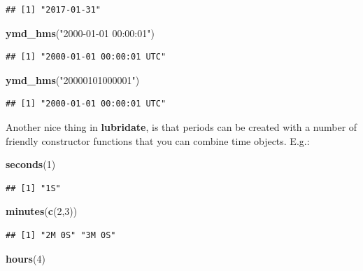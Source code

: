 \documentclass[]{book}
\newenvironment{Shaded}{\begin{snugshade}}{\end{snugshade}}
\newcommand{\DecValTok}[1]{\textcolor[rgb]{0.00,0.00,0.81}{#1}}
\newcommand{\KeywordTok}[1]{\textcolor[rgb]{0.13,0.29,0.53}{\textbf{#1}}}
\newcommand{\NormalTok}[1]{#1}
\newcommand{\StringTok}[1]{\textcolor[rgb]{0.31,0.60,0.02}{#1}}
\theoremstyle{definition}
\theoremstyle{definition}
\theoremstyle{definition}
\theoremstyle{remark}
\begin{document}
\begin{verbatim}
## [1] "2017-01-31"
\end{verbatim}

\begin{Shaded}
\begin{Highlighting}[]
\KeywordTok{ymd_hms}\NormalTok{(}\StringTok{"2000-01-01 00:00:01"}\NormalTok{)}
\end{Highlighting}
\end{Shaded}

\begin{verbatim}
## [1] "2000-01-01 00:00:01 UTC"
\end{verbatim}

\begin{Shaded}
\begin{Highlighting}[]
\KeywordTok{ymd_hms}\NormalTok{(}\StringTok{"20000101000001"}\NormalTok{)}
\end{Highlighting}
\end{Shaded}

\begin{verbatim}
## [1] "2000-01-01 00:00:01 UTC"
\end{verbatim}

Another nice thing in \textbf{lubridate}, is that periods can be created with a number of friendly constructor functions that you can combine time objects. E.g.:

\begin{Shaded}
\begin{Highlighting}[]
\KeywordTok{seconds}\NormalTok{(}\DecValTok{1}\NormalTok{)}
\end{Highlighting}
\end{Shaded}

\begin{verbatim}
## [1] "1S"
\end{verbatim}

\begin{Shaded}
\begin{Highlighting}[]
\KeywordTok{minutes}\NormalTok{(}\KeywordTok{c}\NormalTok{(}\DecValTok{2}\NormalTok{,}\DecValTok{3}\NormalTok{))}
\end{Highlighting}
\end{Shaded}

\begin{verbatim}
## [1] "2M 0S" "3M 0S"
\end{verbatim}

\begin{Shaded}
\begin{Highlighting}[]
\KeywordTok{hours}\NormalTok{(}\DecValTok{4}\NormalTok{)}
\end{Highlighting}
\end{Shaded}
\end{document}
